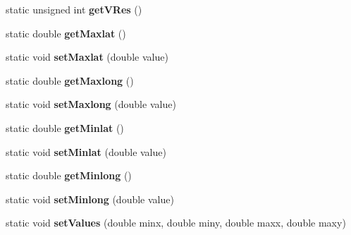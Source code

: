\begin{DoxyCompactItemize}
\item 
\hypertarget{class_s_d_l_graph_draw_ae9350eadef9862b43aa9e6c5c5f87fb3}{}static unsigned int {\bfseries get\+V\+Res} ()\label{class_s_d_l_graph_draw_ae9350eadef9862b43aa9e6c5c5f87fb3}

\item 
\hypertarget{class_s_d_l_graph_draw_aeb392bdfcb20bc810b957078606785c7}{}static double {\bfseries get\+Maxlat} ()\label{class_s_d_l_graph_draw_aeb392bdfcb20bc810b957078606785c7}

\item 
\hypertarget{class_s_d_l_graph_draw_afc9db32ed6b0f8e4c4038b54c64ead17}{}static void {\bfseries set\+Maxlat} (double value)\label{class_s_d_l_graph_draw_afc9db32ed6b0f8e4c4038b54c64ead17}

\item 
\hypertarget{class_s_d_l_graph_draw_ada42c2cc2296ebb0a3aadd0251ad2ae1}{}static double {\bfseries get\+Maxlong} ()\label{class_s_d_l_graph_draw_ada42c2cc2296ebb0a3aadd0251ad2ae1}

\item 
\hypertarget{class_s_d_l_graph_draw_abc69645ab176b5641e86f381a01808f3}{}static void {\bfseries set\+Maxlong} (double value)\label{class_s_d_l_graph_draw_abc69645ab176b5641e86f381a01808f3}

\item 
\hypertarget{class_s_d_l_graph_draw_a04f1f6a61bdb041f1aac598c1cb07587}{}static double {\bfseries get\+Minlat} ()\label{class_s_d_l_graph_draw_a04f1f6a61bdb041f1aac598c1cb07587}

\item 
\hypertarget{class_s_d_l_graph_draw_aac068db479965497c6a3c4e0735f9980}{}static void {\bfseries set\+Minlat} (double value)\label{class_s_d_l_graph_draw_aac068db479965497c6a3c4e0735f9980}

\item 
\hypertarget{class_s_d_l_graph_draw_a7047fc03c8b1032b8f3a4fda05c483ae}{}static double {\bfseries get\+Minlong} ()\label{class_s_d_l_graph_draw_a7047fc03c8b1032b8f3a4fda05c483ae}

\item 
\hypertarget{class_s_d_l_graph_draw_a8af0e7e103ed4b2f4fbdddf77e90dc2c}{}static void {\bfseries set\+Minlong} (double value)\label{class_s_d_l_graph_draw_a8af0e7e103ed4b2f4fbdddf77e90dc2c}

\item 
\hypertarget{class_s_d_l_graph_draw_a8606399583858d969b2e0cd0b5e832ca}{}static void {\bfseries set\+Values} (double minx, double miny, double maxx, double maxy)\label{class_s_d_l_graph_draw_a8606399583858d969b2e0cd0b5e832ca}


\end{DoxyCompactItemize}
